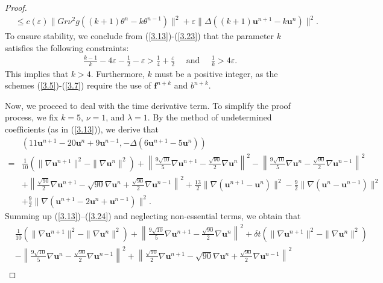 \documentclass[10pt]{article}
\begin{document}
\begin{proof}
\begin{align}
			&\leq c(\varepsilon)\|Gr\nu^2g((k+1)\theta^n-k\theta^{n-1})\|^2+\varepsilon\|\Delta((k+1)\bm{u}^{n+1}-k\bm{u}^n)\|^2.
		\end{align}
		To ensure stability, we conclude from (\ref{3.13})-(\ref{3.23}) that the parameter \( k \) satisfies the following constraints:
		\begin{align}
			&\frac{k-1}{k}-4\varepsilon-\frac{1}{2}-\varepsilon>\frac{1}{4}+\frac{\varepsilon}{2}  \quad \text{ and }  \quad \frac{1}{k}>4\varepsilon.\nonumber
		\end{align}
		This implies that \( k > 4 \). Furthermore, $k$ must be a positive integer, as the schemes (\ref{3.5})-(\ref{3.7}) require the use of \(\bm{f}^{n+k}\) and \(b^{n+k}\).
		
		Now, we proceed to deal with the time derivative term. To simplify the proof process, we fix \( k = 5 \), \( \nu = 1 \), and \( \lambda = 1 \). By the method of undetermined coefficients (as in (\ref{3.13})), we derive that
		\begin{align}\label{3.24}
			&(11\bm{u}^{n+1} - 20\bm{u}^n + 9\bm{u}^{n-1}, -\Delta(6\bm{u}^{n+1} - 5\bm{u}^n)) \nonumber\\
			\nonumber
			= & \frac{1}{10} \left( \|\nabla \bm{u}^{n+1}\|^2 - \|\nabla \bm{u}^n\|^2 \right) + \left\| \frac{9\sqrt{10}}{5} \nabla \bm{u}^{n+1} - \frac{\sqrt{90}}{2} \nabla \bm{u}^n \right\|^2 - \left\| \frac{9\sqrt{10}}{5} \nabla \bm{u}^n - \frac{\sqrt{90}}{2} \nabla \bm{u}^{n-1} \right\|^2 \\
			\nonumber
			&  + \left\| \frac{\sqrt{90}}{2} \nabla \bm{u}^{n+1} - \sqrt{90} \nabla \bm{u}^n + \frac{\sqrt{90}}{2} \nabla \bm{u}^{n-1} \right\|^2  + \frac{13}{2} \|\nabla(\bm{u}^{n+1} - \bm{u}^n)\|^2 - \frac{9}{2} \|\nabla(\bm{u}^n - \bm{u}^{n-1})\|^2\nonumber\\
			& + \frac{9}{2} \|\nabla(\bm{u}^{n+1} - 2\bm{u}^n + \bm{u}^{n-1})\|^2.
		\end{align}
		Summing up (\ref{3.13})–(\ref{3.24}) and  neglecting non-essential terms, we obtain that
		\begin{align}\label{3.25}
			& \frac{1}{10} \left( \|\nabla \bm{u}^{n+1}\|^2 - \|\nabla \bm{u}^n\|^2 \right) + \left\| \frac{9\sqrt{10}}{5} \nabla \bm{u}^{n+1} - \frac{\sqrt{90}}{2} \nabla \bm{u}^n \right\|^2+\delta t(\|\nabla\bm{u}^{n+1}\|^2-\|\nabla\bm{u}^{n}\|^2) \nonumber\\
			&   - \left\| \frac{9\sqrt{10}}{5} \nabla \bm{u}^n - \frac{\sqrt{90}}{2} \nabla \bm{u}^{n-1} \right\|^2 + \left\| \frac{\sqrt{90}}{2} \nabla \bm{u}^{n+1} - \sqrt{90} \nabla \bm{u}^n + \frac{\sqrt{90}}{2} \nabla \bm{u}^{n-1} \right\|^2 \nonumber\\

\end{align}
\end{proof}
\end{document}
